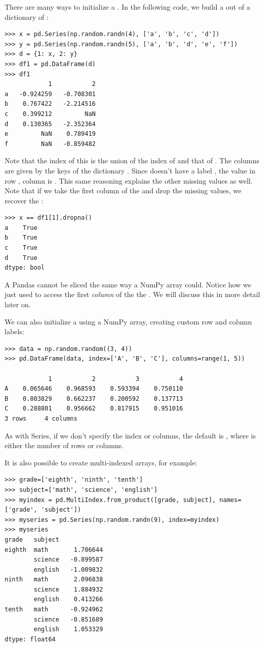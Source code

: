 There are many ways to initialize a . In the following code, we build a  out of a
dictionary of :
\begin{lstlisting}
>>> x = pd.Series(np.random.randn(4), ['a', 'b', 'c', 'd'])
>>> y = pd.Series(np.random.randn(5), ['a', 'b', 'd', 'e', 'f'])
>>> d = {1: x, 2: y}
>>> df1 = pd.DataFrame(d)
>>> df1
	        1	        2
a	-0.924259	-0.708301
b	 0.767422	-2.214516
c	 0.399212	      NaN
d	 0.130365	-2.352364
e	      NaN	 0.789419
f	      NaN	-0.859482
\end{lstlisting}
Note that the index of this  is the union of the index of   and that of  .
The columns are given by the keys of the dictionary . Since  doesn't have a label , the
value in row , column  is . This same reasoning explains the other missing values as well.
Note that if we take the first column of the  and drop the missing values, we recover the  :
\begin{lstlisting}
>>> x == df1[1].dropna()
a    True
b    True
c    True
d    True
dtype: bool
\end{lstlisting}

\begin{warn}
A Pandas  cannot be sliced the same way a NumPy array could.
Notice how we just used  to access the first \emph{column} of the the  .
We will discuss this in more detail later on.
\end{warn}

We can also initialize a  using a NumPy array, creating custom row and column labels:
\begin{lstlisting}
>>> data = np.random.random((3, 4))
>>> pd.DataFrame(data, index=['A', 'B', 'C'], columns=range(1, 5))

            1	        2	        3	        4
A	 0.065646	 0.968593	 0.593394	 0.750110
B	 0.803829	 0.662237	 0.200592	 0.137713
C	 0.288801	 0.956662	 0.817915	 0.951016
3 rows     4 columns
\end{lstlisting}
As with Series, if we don't specify the index or columns, the default is , where 
is either the number of rows or columns.

It is also possible to create multi-indexed arrays, for example:
\begin{lstlisting}
>>> grade=['eighth', 'ninth', 'tenth']
>>> subject=['math', 'science', 'english']
>>> myindex = pd.MultiIndex.from_product([grade, subject], names=['grade', 'subject'])
>>> myseries = pd.Series(np.random.randn(9), index=myindex)
>>> myseries
grade   subject
eighth  math       1.706644
        science   -0.899587
        english   -1.009832
ninth   math       2.096838
        science    1.884932
        english    0.413266
tenth   math      -0.924962
        science   -0.851689
        english    1.053329
dtype: float64
\end{lstlisting}

